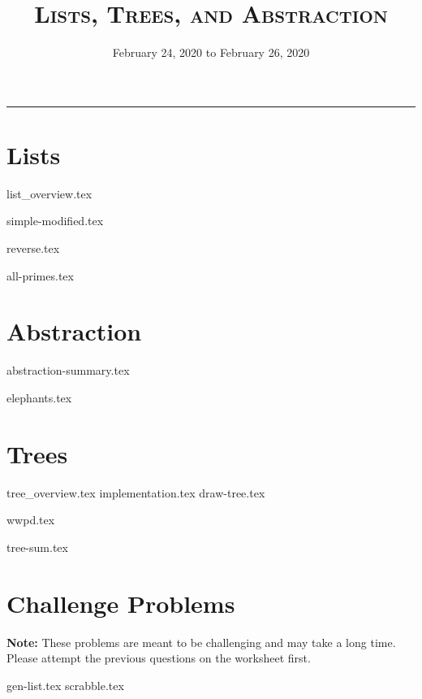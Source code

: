 \documentclass{exam}
\title{\textsc{Lists, Trees, and Abstraction}}
\date{February 24, 2020 to February 26, 2020}
\begin{document}
\maketitle
\rule{\textwidth}{0.15em}
\fontsize{12}{15}\selectfont


\section{Lists}
{list_overview.tex}
\begin{questions}
{simple-modified.tex}

\begin{blocksection}
{reverse.tex}
\end{blocksection}

\begin{blocksection}
{all-primes.tex}
\end{blocksection}
\end{questions}

\newpage
\section{Abstraction}
{abstraction-summary.tex}
\begin{questions}
{elephants.tex}

\end{questions}

\newpage
\section{Trees}
{tree_overview.tex}
{implementation.tex}
{draw-tree.tex}
\begin{questions}
{wwpd.tex}

{tree-sum.tex}

\end{questions}

\newpage
\section{Challenge Problems}
\textbf{Note:} These problems are meant to be challenging and may take a long time. Please attempt the previous questions on the worksheet first.
\begin{questions}
{gen-list.tex}
\newpage
{scrabble.tex}
\end{questions}
\end{document}
